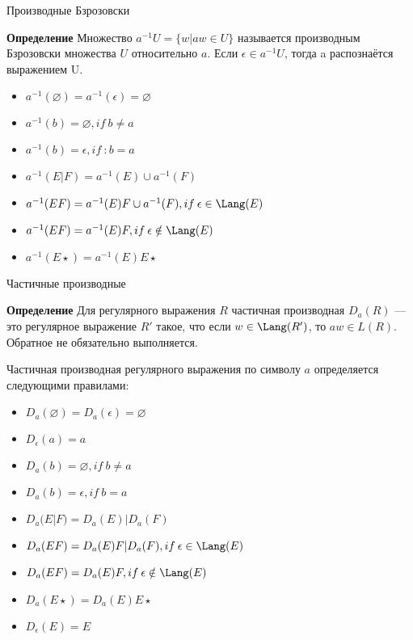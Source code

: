 \begin{frame}{Производные Бзрозовски}
    \vspace{-5pt}
    \begin{block}{\bf Определение}
    Множество $a^{-1} U = \{w | aw \in U\}$ называется производным Бзрозовски множества $U$ относительно $a$. Если $\epsilon \in a^{-1} U$, тогда a распознаётся выражением U.
    \end{block}
    \begin{itemize}
        \item $a^{-1}(\varnothing) = a^{-1}(\epsilon) = \varnothing$
        \item $a^{-1}(b) = \varnothing, if\:b \neq a$
        \item $a^{-1}(b) = \epsilon, if\ :b = a$
        \item $a^{-1}(E|F) = a^{-1}(E) \cup a^{-1}(F)$
        \item $a^{-1}(EF) = a^{-1}(E)F \cup a^{-1}(F), if \: \epsilon \in \Lang(E)$
        \item $a^{-1}(EF) = a^{-1}(E)F, if \: \epsilon \notin \Lang(E)$
        \item $a^{-1}(E \star ) = a^{-1}(E) E \star$
    \end{itemize}
\end{frame}
\begin{frame}{Частичные производные}
    \begin{block}{\bf Определение}
    Для регулярного выражения $R$ частичная производная $D_a(R)$ — это регулярное выражение $R'$ такое, что если $w \in \Lang(R')$, то $aw \in L(R)$. Обратное не обязательно выполняется.
    \end{block}
    Частичная производная регулярного выражения по символу $a$ определяется следующими правилами:
    \begin{itemize}
        \item $D_a(\varnothing) = D_a(\epsilon) = \varnothing$
        \item $D_\epsilon(a) = a$
        \item $D_a(b) = \varnothing, if\:b \neq a$
        \item $D_a(b) = \epsilon, if\:b = a$
        \item $D_a(E | F) = D_a(E) | D_a(F)$
        \item $D_a(EF) = D_a(E)F | D_a(F), if \: \epsilon \in \Lang(E)$
        \item $D_a(EF) = D_a(E)F, if \: \epsilon \notin \Lang(E)$
        \item $D_a(E \star ) = D_a(E) E \star$
        \item $D_\epsilon(E) = E$
    \end{itemize}
\end{frame} %
